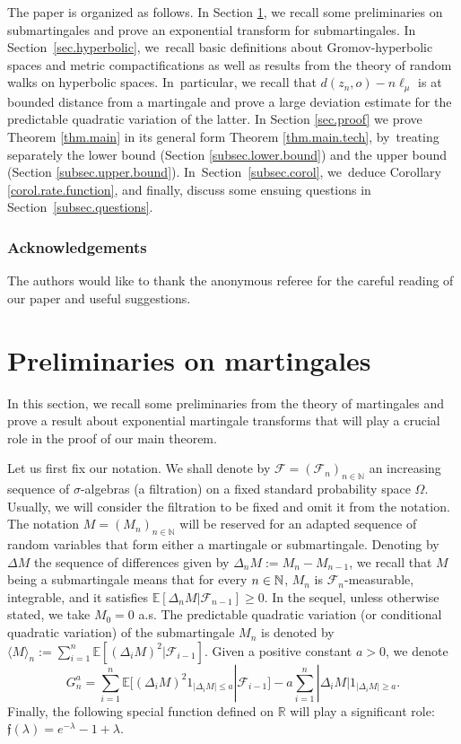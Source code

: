 \documentclass[10pt]{amsart}
\theoremstyle{plain}
\theoremstyle{definition}
\newcommand\R{\mathbb{R}}
\newcommand\N{\mathbb{N}}
\begin{document}
The paper is organized as follows. In Section \ref{sec.martingale}, we recall some preliminaries on submartingales and prove an exponential transform for submartingales. In Section~\ref{sec.hyperbolic}, we~recall basic definitions about Gromov-hyperbolic spaces and metric compactifications as well as results from the theory of random walks on hyperbolic spaces. In~particular, we recall that $d(z_n, o) -n\ell_{\mu}$ is at bounded distance from a martingale and prove a large deviation estimate for the predictable quadratic variation of the latter. In Section \ref{sec.proof} we prove Theorem \ref{thm.main} in its general form Theorem \ref{thm.main.tech}, by~treating separately the lower bound (Section \ref{subsec.lower.bound}) and the upper bound (Section \ref{subsec.upper.bound}). In~Section~\ref{subsec.corol}, we~deduce Corollary \ref{corol.rate.function}, and finally, discuss some ensuing questions in Section~\ref{subsec.questions}.

\subsubsection*{Acknowledgements}
The authors would like to thank the anonymous referee for the careful reading of our paper and useful suggestions.

\section{Preliminaries on martingales}\label{sec.martingale}

In this section, we recall some preliminaries from the theory of martingales and prove a result about exponential martingale transforms that will play a crucial role in the proof of our main theorem.

Let us first fix our notation. We shall denote by $\mathcal{F}=(\mathcal{F}_n)_{n\in \N}$ an increasing sequence of $\sigma$-algebras (a filtration) on a fixed standard probability space $\Omega$. Usually, we will consider the filtration to be fixed and omit it from the notation. The notation $M=(M_n)_{n \in \N}$ will be reserved for an adapted sequence of random variables that form either a martingale or submartingale. Denoting by $\Delta M$ the sequence of differences given by $\Delta_n M:=M_n-M_{n-1}$, we recall that $M$ being a submartingale means that for every $n\in\nobreak \N$, $M_n$ is $\mathcal{F}_n$-measurable, integrable, and it satisfies \hbox{$\mathbb{E}[\Delta_n M | \mathcal{F}_{n-1}] \geq 0$}. In the sequel, unless otherwise stated, we take $M_0=0$ a.s. The predictable quadratic variation (or conditional quadratic variation) of the submartingale $M_n$ is denoted by $\langle M\rangle_n:= \sum_{i=1}^n \mathbb{E}[(\Delta_i M)^2|\mathcal{F}_{i-1}]$. Given a positive constant $a>0$, we denote
\begin{equation}\label{transform.G}
G_n^a=\sum_{i=1}^n \mathbb{E}[(\Delta_i M)^2 1_{|\Delta_i M| \leq a}| \mathcal{F}_{i-1}]-a \sum_{i=1}^n |\Delta_i M| 1_{|\Delta_i M| \geq a}.\end{equation} Finally, the following special function defined on $\R$ will play a significant role: $\mathfrak{f}(\lambda)=e^{-\lambda} -1 +\lambda$.\vspace*{-3pt}
\end{document}
